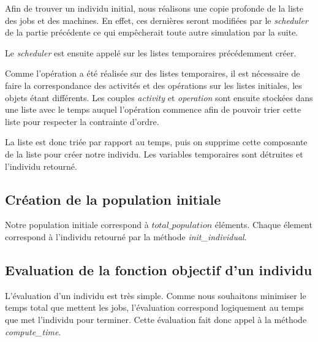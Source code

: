Afin de trouver un individu initial, nous réalisons une copie profonde de la liste des jobs et des machines. En effet, ces dernières seront modifiées par le \textit{scheduler} de la partie précédente ce qui empêcherait toute autre simulation par la suite.



Le \textit{scheduler} est ensuite appelé sur les listes temporaires précédemment créer.



Comme l'opération a été réalisée sur des listes temporaires, il est nécessaire de faire la correspondance des activités et des opérations sur les listes initiales, les objets étant différents. Les couples \textit{activity} et \textit{operation} sont ensuite stockées dans une liste avec le temps auquel l'opération commence afin de pouvoir trier cette liste pour respecter la contrainte d'ordre.



La liste est donc triée par rapport au temps, puis on supprime cette composante de la liste pour créer notre individu. Les variables temporaires sont détruites et l'individu retourné.

\subsection{Création de la population initiale}



Notre population initiale correspond à $total\_population$ éléments. Chaque élement correspond à l'individu retourné par la méthode \textit{init\_individual}.

\subsection{Evaluation de la fonction objectif d'un individu}



L'évaluation d'un individu est très simple. Comme nous souhaitons minimiser le temps total que mettent les jobs, l'évaluation correspond logiquement au temps que met l'individu pour terminer. Cette évaluation fait donc appel à la méthode \textit{compute\_time}. 
\newpage

